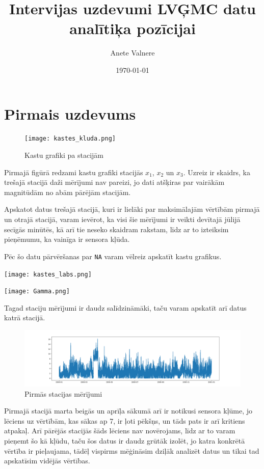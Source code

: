 \documentclass[12pt,a4paper]{article}
\title{Intervijas uzdevumi LVĢMC datu analītiķa pozīcijai}
\author{Anete Valnere}
\date{\today}
\begin{document}
\begingroup
\let\center\flushright
\let\endcenter\endflushright
\maketitle
\endgroup
\section*{Pirmais uzdevums}


\begin{figure}[h]
    \centering
    \texttt{[image: kastes\_kluda.png]}
    \caption{Kastu grafiki pa stacijām}
\end{figure}
Pirmajā figūrā redzami kastu grafiki stacijās \(x_1\), \(x_2\) un \(x_3\). Uzreiz ir skaidrs, ka trešajā stacijā daži mērījumi nav pareizi, jo dati atšķiras par vairākām magnitūdām no abām pārējām stacijām.%


Apskatot datus trešajā stacijā, kuri ir lielāki par maksimālajām vērtībām pirmajā un otrajā stacijā, varam ievērot, ka visi šie mērījumi ir veikti devītajā jūlijā secīgās minūtēs, kā arī tie neseko skaidram rakstam, līdz ar to izteiksim pieņēmumu, ka vainīga ir sensora kļūda.

Pēc šo datu pārvēršanas par \texttt{NA} varam vēlreiz apskatīt kastu grafikus.

\noindent\begin{minipage}[t]{.7\textwidth}
    \centering
    \texttt{[image: kastes\_labs.png]}
\end{minipage}%
\begin{minipage}[t]{.3\textwidth}
    \centering
    \texttt{[image: Gamma.png]}
    \label{gamma}
\end{minipage}


Tagad staciju mērījumi ir daudz salīdzināmāki, taču varam apskatīt arī datus katrā stacijā.
\begin{figure}[h]
    \centering
    \includegraphics[width=14cm]{x1.png}
    \caption{Pirmās stacijas mērījumi}\label{fig:x1}
\end{figure}
Pirmajā stacijā marta beigās un aprīļa sākumā arī ir notikusi sensora kļūme, jo lēciens uz vērtībām, kas sākas ap 7, ir ļoti pēkšņs, un tāds pats ir arī kritiens atpakaļ. Arī pārējās stacijās šāds lēciens nav novērojams, līdz ar to varam pieņemt šo kā kļūdu, taču šos datus ir daudz grūtāk izolēt, jo katra konkrētā vērtība ir pieļaujama, tādēļ vispirms mēģināsim dziļāk analizēt datus un tikai tad apskatīsim vidējās vērtības.
\end{document}
